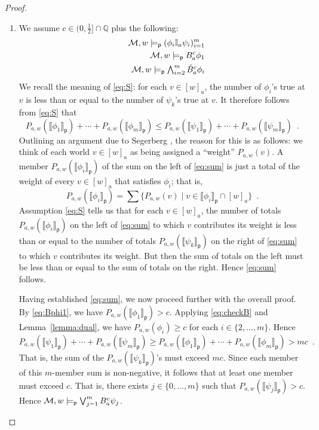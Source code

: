 \documentclass[12pt]{article}
\theoremstyle{definition}
\newcommand{\Rat}{\mathbb{Q}}  %
\newcommand{\M}{{\cal M}}      %
\newcommand{\modelsp}{\models_{\mathsf{p}}}                  %
\newcommand{\semp}[1]{\llbracket{#1}\rrbracket_{\mathsf{p}}} %
\begin{document}
\begin{proof}
\begin{enumerate}
  \item We assume $c\in(0,\frac 12]\cap\Rat$ plus the following:
    \begin{eqnarray}
      &&
      \M,w\modelsp (\phi_i\mathbb{I}_a\psi_i)_{i=1}^m
      \label{eq:S}
      \\
      &&
      \M,w\modelsp B^c_a\phi_1
      \label{eq:Bphi1}
      \\
      &&
      \textstyle \M,w\modelsp \bigwedge_{i=2}^m\check B^c_a\phi_i
      \label{eq:checkB}
    \end{eqnarray}
    We recall the meaning of
    \eqref{eq:S}: for each $v\in[w]_a$, the number of
    $\phi_i$'s true at $v$ is less than or equal to the number of $\psi_k$'s true at $v$.
    It therefore follows from \eqref{eq:S} that
    \begin{equation}
      P_{a,w}(\semp{\phi_1})+\cdots+P_{a,w}(\semp{\phi_m})\leq
      P_{a,w}(\semp{\psi_1})+\cdots+P_{a,w}(\semp{\psi_m})\enspace.
      \label{eq:sum}
    \end{equation}
    Outlining an argument due to Segerberg 
    \cite[pp.~344--346]{Segerberg1971:qpiams},
    the reason for this is as follows: we think of each world $v\in[w]_a$ as being
    assigned a ``weight'' $P_{a,w}(v)$.  A member $P_{a,w}(\semp{\phi_i})$ of the
    sum on the left of \eqref{eq:sum} is just a total of the
    weight of every $v\in[w]_a$ that satisfies
    $\phi_i$; that is,
    \[
    P_{a,w}(\semp{\phi_i})=\sum\{P_{a,w}(v)\mid v\in\semp{\phi_i}\cap[w]_a\}\enspace.
    \]
    Assumption \eqref{eq:S} tells us that for each $v\in[w]_a$, the
    number of totals $P_{a,w}(\semp{\phi_i})$ on the left of
    \eqref{eq:sum} to which $v$ contributes its weight is less than or equal to the
    number of totals $P_{a,w}(\semp{\psi_k})$ on the right of
    \eqref{eq:sum} to which $v$ contributes its weight.  But then the
    sum of totals on the left must be less than or equal to the sum of totals on the
    right.  Hence \eqref{eq:sum} follows.

    Having established \eqref{eq:sum}, we now proceed further with the
    overall proof.  By \eqref{eq:Bphi1}, we have
    $P_{a,w}(\semp{\phi_1})>c$.  Applying \eqref{eq:checkB}
    and Lemma~\ref{lemma:dual}, we have $P_{a,w}(\phi_i)\geq
    c$ for each $i\in\{2,\dots,m\}$.  Hence
    \[
    P_{a,w}(\semp{\psi_1})+\cdots+P_{a,w}(\semp{\psi_m})\geq
    P_{a,w}(\semp{\phi_1})+\cdots+P_{a,w}(\semp{\phi_m})> mc\enspace.
    \]
    That is, the sum of the $P_{a,w}(\semp{\psi_k})$'s must exceed
    $mc$.  Since each member of this $m$-member sum is
    non-negative, it follows that at least one member must exceed
    $c$.  That is, there exists $j\in\{0,\dots,m\}$ such
    that $P_{a,w}(\semp{\psi_j})>c$.  Hence
    $\M,w\modelsp\bigvee_{j=1}^mB_a^c\psi_j$. \qedhere
  \end{enumerate}
\end{proof}
\end{document}

